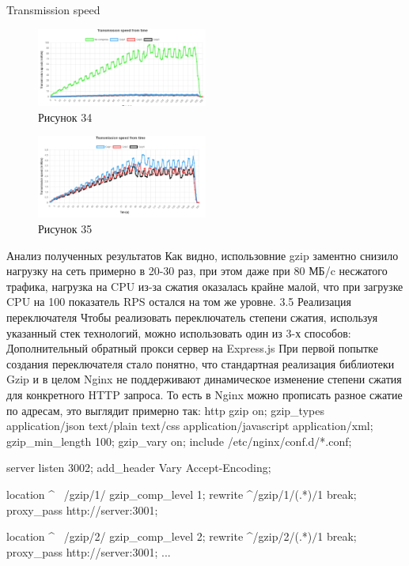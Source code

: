 \documentclass[12pt]{article}
\begin{document}
Transmission speed
\begin{figure}[h!]
\centering
\includegraphics[width=0.5\textwidth]{../images/second_part/Transmission_speed.png}
\caption{Рисунок 34}
\end{figure}

\begin{figure}[h!]
\centering
\includegraphics[width=0.5\textwidth]{../images/second_part/Transmission_speed_withot_nocompress.png}
\caption{Рисунок 35}
\end{figure}

Анализ полученных результатов
Как видно, использовние gzip заментно снизило нагрузку на сеть примерно в 20-30 раз,
при этом даже при 80 МБ/c несжатого трафика, нагрузка на CPU из-за сжатия оказалась крайне малой, что при загрузке CPU на 100%
показатель RPS остался на том же уровне.
3.5 Реализация переключателя
Чтобы реализовать переключатель степени сжатия, используя указанный стек технологий, можно использовать один из 3-х способов: 
Дополнительный обратный прокси сервер на Express.js
При первой попытке создания переключателя стало понятно, что стандартная реализация библиотеки Gzip и в целом Nginx не поддерживают динамическое изменение степени сжатия для конкретного HTTP запроса. То есть в Nginx можно прописать разное сжатие по адресам, это выглядит примерно так:
http 
    gzip on;
    gzip_types application/json text/plain text/css application/javascript application/xml;
    gzip_min_length 100;
    gzip_vary on;
    include /etc/nginx/conf.d/*.conf;

    server 
        listen 3002;
        add_header Vary Accept-Encoding;

        location ^~ /gzip/1/ {
            gzip_comp_level 1;
            rewrite ^/gzip/1/(.*)$ /$1 break;
            proxy_pass http://server:3001;
        }

        location ^~ /gzip/2/ {
            gzip_comp_level 2;
            rewrite ^/gzip/2/(.*)$ /$1 break;
            proxy_pass http://server:3001;
        }
    ...
\end{document}
